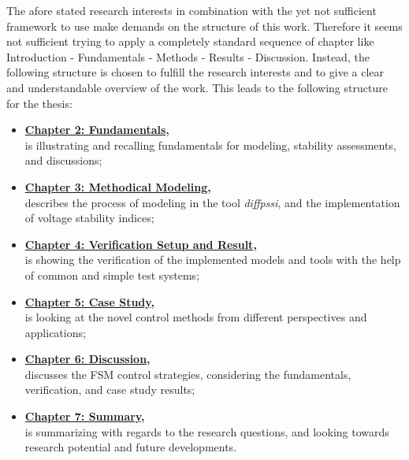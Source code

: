The afore stated research interests in combination with the yet not sufficient framework to use make demands on the structure of this work. 
Therefore it seems not sufficient trying to apply a completely standard sequence of chapter like \glqq Introduction - Fundamentals - Methods - Results - Discussion\grqq.
Instead, the following structure is chosen to fulfill the research interests and to give a clear and understandable overview of the work.
This leads to the following structure for the thesis: 
\begin{itemize}
    \item \textbf{\hyperref[chap:fundamentals]{Chapter 2: Fundamentals},}\\
    is illustrating and recalling fundamentals for modeling, stability assessments, and discussions;
    \item \textbf{\hyperref[chap:methodical-modeling]{Chapter 3: Methodical Modeling},}\\
    describes the process of modeling in the tool \textit{diffpssi}, and the implementation of voltage stability indices;
    \item \textbf{\hyperref[chap:verification]{Chapter 4: Verification Setup and Result},}\\
    is showing the verification of the implemented models and tools with the help of common and simple test systems;
    \item \textbf{\hyperref[chap:case-study]{Chapter 5: Case Study},}\\
    is looking at the novel control methods from different perspectives and applications; 
    \item \textbf{\hyperref[chap:discussion]{Chapter 6: Discussion},}\\
    discusses the FSM control strategies, considering the fundamentals, verification, and case study results;
    \item \textbf{\hyperref[chap:summary]{Chapter 7: Summary},}\\
    is summarizing with regards to the research questions, and looking towards research potential and future developments. 
\end{itemize}

